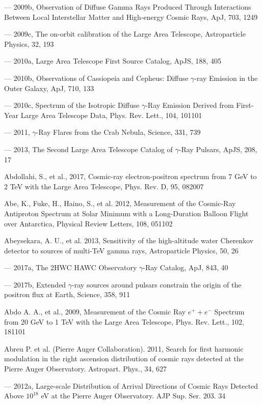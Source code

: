 --- 2009b, \fermilat{} Observation of Diffuse Gamma Rays Produced Through Interactions Between Local Interstellar Matter and High-energy Cosmic Rays, ApJ, 703, 1249

--- 2009c, The on-orbit calibration of the \fermi{} Large Area Telescope, Astroparticle Physics, 32, 193

--- 2010a, \fermi{} Large Area Telescope First Source Catalog, ApJS, 188, 405

--- 2010b, \fermi{} Observations of Cassiopeia and Cepheus: Diffuse $\gamma$-ray Emission in the Outer Galaxy, ApJ, 710, 133

--- 2010c, Spectrum of the Isotropic Diffuse $\gamma$-Ray Emission Derived from First-Year \fermi{} Large Area Telescope Data, Phys. Rev. Lett., 104, 101101

--- 2011, $\gamma$-Ray Flares from the Crab Nebula, Science, 331, 739

--- 2013, The Second \fermi{} Large Area Telescope Catalog of $\gamma$-Ray Pulsars, ApJS, 208, 17

Abdollahi, S., et al., 2017, Cosmic-ray electron-positron spectrum from 7 GeV to 2 TeV with the \fermi{} Large Area Telescope, Phys. Rev. D, 95, 082007

Abe, K., Fuke, H., Haino, S., et al. 2012, Measurement of the Cosmic-Ray Antiproton Spectrum at Solar Minimum with a Long-Duration Balloon Flight over Antarctica, Physical Review Letters, 108, 051102

Abeysekara, A. U., et al. 2013, Sensitivity of the high-altitude water Cherenkov detector to sources of multi-TeV gamma rays, Astroparticle Physics, 50, 26

--- 2017a, The 2HWC HAWC Observatory $\gamma$-Ray Catalog, ApJ, 843, 40

--- 2017b, Extended $\gamma$-ray sources around pulsars constrain the origin of the positron flux at Earth, Science, 358, 911

Abdo A. A., et al., 2009, Measurement of the Cosmic Ray $e^+ + e^-$ Spectrum from 20 GeV to 1 TeV with the \fermi{} Large Area Telescope, Phys. Rev. Lett., 102, 181101

Abreu P. et al. (Pierre Auger Collaboration). 2011, Search for first harmonic modulation in the right ascension distribution of cosmic rays detected at the Pierre Auger Observatory. Astropart. Phys., 34, 627

--- 2012a, Large-scale Distribution of Arrival Directions of Cosmic Rays Detected Above $10^{18}$ eV at the Pierre Auger Observatory. AJP Sup. Ser. 203. 34

